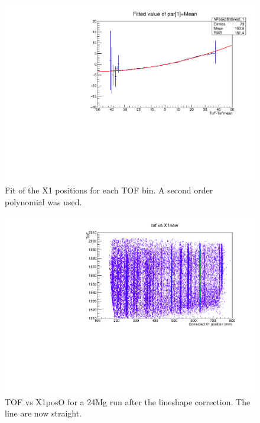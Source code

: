 \documentclass[]{report}
\begin{document}
\begin{figure}
	\includegraphics[width=\linewidth]{Figure/run2227-24Mg-lineshape-X1TOF-fit.pdf}
	\caption{Fit of the X1 positions for each TOF bin. A second order polynomial was used.}
	\label{fig:TOFvsX1_fit}
\end{figure}

\begin{figure}
	\includegraphics[width=\linewidth]{Figure/run2227-24Mg-lineshape-X1TOF-corr.pdf}
	\caption{TOF vs X1posO for a 24Mg run after the lineshape correction. The line are now straight.}
	\label{fig:TOFvsX1_corr}
\end{figure}
\end{document}
